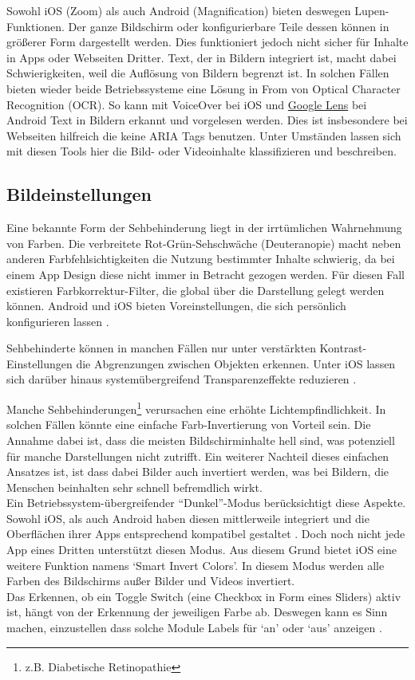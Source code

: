 Sowohl iOS (Zoom) als auch Android (Magnification) bieten deswegen Lupen-Funktionen. Der ganze Bildschirm oder konfigurierbare Teile dessen können in größerer Form dargestellt werden. Dies funktioniert jedoch nicht sicher für Inhalte in Apps oder Webseiten Dritter. Text, der in Bildern integriert ist, macht dabei Schwierigkeiten, weil die Auflösung von Bildern begrenzt ist. In solchen Fällen bieten wieder beide Betriebssysteme eine
Lösung in From von Optical Character Recognition (OCR). So kann mit VoiceOver bei iOS \cite{iOS} und \href{https://lens.google.com/}{Google Lens} bei Android Text in Bildern erkannt und vorgelesen werden. Dies ist insbesondere bei Webseiten hilfreich die keine ARIA Tags benutzen. Unter Umständen lassen sich mit diesen Tools hier die Bild- oder Videoinhalte klassifizieren und beschreiben.

\subsection{Bildeinstellungen}

Eine bekannte Form der Sehbehinderung liegt in der irrtümlichen Wahrnehmung von Farben. Die verbreitete Rot-Grün-Sehschwäche (Deuteranopie) macht neben anderen Farbfehlsichtigkeiten die Nutzung bestimmter Inhalte schwierig, da bei einem App Design diese nicht immer in Betracht gezogen werden. Für diesen Fall existieren Farbkorrektur-Filter, die global über die Darstellung gelegt werden können. Android und iOS bieten Voreinstellungen, die sich persönlich konfigurieren lassen \cite{iOS, Android}.

Sehbehinderte können in manchen Fällen nur unter verstärkten Kontrast-Einstellungen die Abgrenzungen zwischen Objekten erkennen. Unter iOS lassen sich darüber hinaus systemübergreifend Transparenzeffekte reduzieren \cite{iOS}.

Manche Sehbehinderungen\footnote{z.B. Diabetische Retinopathie} verursachen eine erhöhte Lichtempfindlichkeit. In solchen Fällen könnte eine einfache Farb-Invertierung von Vorteil sein. Die Annahme dabei ist, dass die
meisten Bildschirminhalte hell sind, was potenziell für manche Darstellungen nicht zutrifft. Ein weiterer Nachteil dieses einfachen Ansatzes ist, ist dass dabei Bilder auch invertiert werden, was bei Bildern, die Menschen beinhalten sehr schnell befremdlich wirkt.
\\Ein Betriebssystem-übergreifender ``Dunkel''-Modus berücksichtigt diese Aspekte. Sowohl iOS, als auch Android haben diesen mittlerweile integriert und die Oberflächen ihrer Apps entsprechend kompatibel gestaltet
\cite{ios-colors, Android}. Doch noch nicht jede App eines Dritten unterstützt diesen Modus. Aus diesem Grund bietet iOS eine weitere Funktion namens `Smart Invert Colors'. In diesem Modus werden alle Farben des Bildschirms außer Bilder und Videos invertiert.
\\Das Erkennen, ob ein Toggle Switch (eine Checkbox in Form eines Sliders) aktiv ist, hängt von der Erkennung der jeweiligen Farbe ab. Deswegen kann es Sinn machen, einzustellen dass solche Module Labels für `an'  oder `aus' anzeigen \cite{ios-colors}.

